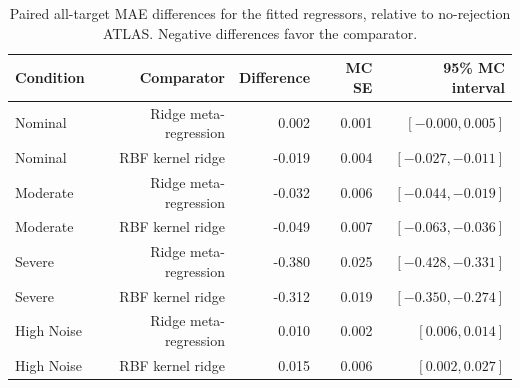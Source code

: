 \begin{table}[htbp]
\centering\small
\setlength{\tabcolsep}{4pt}
\caption{Paired all-target MAE differences for the fitted regressors, relative to no-rejection ATLAS. Negative differences favor the comparator.}
\label{tab:ext-paired}
\begin{tabular}{lrrrr}
\toprule
Condition & Comparator & Difference & MC SE & 95\% MC interval \\
\midrule
Nominal & Ridge meta-regression & 0.002 & 0.001 & $[-0.000, 0.005]$ \\
Nominal & RBF kernel ridge & -0.019 & 0.004 & $[-0.027, -0.011]$ \\
Moderate & Ridge meta-regression & -0.032 & 0.006 & $[-0.044, -0.019]$ \\
Moderate & RBF kernel ridge & -0.049 & 0.007 & $[-0.063, -0.036]$ \\
Severe & Ridge meta-regression & -0.380 & 0.025 & $[-0.428, -0.331]$ \\
Severe & RBF kernel ridge & -0.312 & 0.019 & $[-0.350, -0.274]$ \\
High Noise & Ridge meta-regression & 0.010 & 0.002 & $[0.006, 0.014]$ \\
High Noise & RBF kernel ridge & 0.015 & 0.006 & $[0.002, 0.027]$ \\
\bottomrule
\end{tabular}

\end{table}
